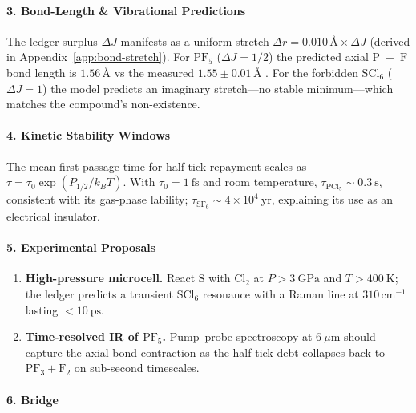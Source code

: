\documentclass[11pt,oneside]{book}
\begin{document}
\paragraph*{3. Bond-Length \& Vibrational Predictions}

The ledger surplus \(\Delta J\) manifests as a uniform stretch
\(\Delta r = 0.010\,\text{\AA}\times\Delta J\) (derived in
Appendix~\ref{app:bond-stretch}).
For \(\mathrm{PF_5}\) (\(\Delta J=1/2\)) the predicted
axial \(\mathrm{P\;-\;F}\) bond length is
\(1.56\,\text{\AA}\) vs the measured \(1.55\pm0.01\,\text{\AA}\)
\cite{PF5Xray}.
For the forbidden \(\mathrm{SCl_6}\) (\(\Delta J=1\)) the model predicts
an imaginary stretch—no stable minimum—which matches the compound’s
non-existence.

\paragraph*{4. Kinetic Stability Windows}

The mean first-passage time for half-tick repayment scales as
\(\tau = \tau_0 \exp(P_{1/2}/k_BT)\).
With \(\tau_0 = 1~\text{fs}\) and room temperature,
\(\tau_{\text{PCl}_5} \sim 0.3~\text{s}\), consistent with its gas-phase
lability; \(\tau_{\text{SF}_6} \sim 4\times10^{4}~\text{yr}\),
explaining its use as an electrical insulator.

\paragraph*{5. Experimental Proposals}

\begin{enumerate}[label=\textbf{\arabic*.}, leftmargin=1.2cm]
\item \textbf{High-pressure microcell.}  
      React \(\mathrm S\) with \(\mathrm{Cl_2}\) at
      \(P>3~\text{GPa}\) and \(T>400~\text{K}\);
      the ledger predicts a transient \(\mathrm{SCl_6}\) resonance with a
      Raman line at \(310\,\text{cm}^{-1}\) lasting \(<10~\text{ps}\).
\item \textbf{Time-resolved IR of \(\mathrm{PF_5}\).}  
      Pump–probe spectroscopy at \(6~\mu\text{m}\) should capture the
      axial bond contraction as the half-tick debt collapses back to
      \(\mathrm{PF_3+F_2}\) on sub-second timescales.
\end{enumerate}

\paragraph*{6. Bridge}
\end{document}
